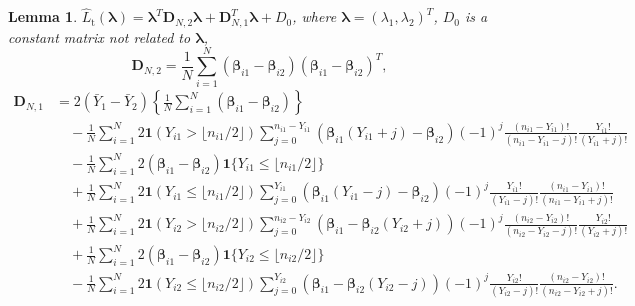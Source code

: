\documentclass[12pt,letterpaper]{article}
\newtheorem{lemma}{Lemma}[section]
\begin{document}
\begin{lemma}\label{lemma:coeff:two-sample:SURE}
$\hat{L}_{\mathrm{t}}(\boldsymbol{\lambda})=\boldsymbol{\lambda}^T\mathbf{D}_{N,2}\boldsymbol{\lambda}+\mathbf{D}_{N,1}^T\boldsymbol{\lambda}+D_0$, where $\boldsymbol{\lambda}=(\lambda_1,\lambda_2)^T$, $D_0$ is a constant matrix not related to $\boldsymbol{\lambda}$, 
\begin{equation}\label{eq:coefficient:quadratic:ML:two-sample}
    \mathbf{D}_{N,2}=\frac{1}{N}\sum_{i=1}^N(\boldsymbol{\beta}_{i1}-\boldsymbol{\beta}_{i2})(\boldsymbol{\beta}_{i1}-\boldsymbol{\beta}_{i2})^T,
\end{equation}
\begin{equation}\label{eq:D:N:1}
\begin{array}{rl}
\mathbf{D}_{N,1}\!\!\!\!\!&\displaystyle=2(\bar{Y}_1-\bar{Y}_2)\left\{\frac{1}{N}\sum_{i=1}^N(\boldsymbol{\beta}_{i1}-\boldsymbol{\beta}_{i2})\right\}\\
    &\displaystyle\quad-\frac{1}{N}\sum_{i=1}^N2\mathbf{1}(Y_{i1} > \lfloor n_{i1}/2\rfloor)\!\!\!\sum_{j=0}^{n_{i1}-Y_{i1}}\!\!\!(\boldsymbol{\beta}_{i1}(Y_{i1}+j)-\boldsymbol{\beta}_{i2})(-1)^{j}\frac{(n_{i1}-Y_{i1})!}{(n_{i1}-Y_{i1}-j)!}\frac{Y_{i1}!}{(Y_{i1}+j)!}\\
    &\quad\displaystyle-\frac{1}{N}\sum_{i=1}^N2(\boldsymbol{\beta}_{i1}-\boldsymbol{\beta}_{i2})\mathbf{1}\{Y_{i1}\leq \lfloor n_{i1}/2\rfloor\}\\
    &\quad\displaystyle+\frac{1}{N}\sum_{i=1}^N2\mathbf{1}(Y_{i1}\leq \lfloor n_{i1}/2\rfloor)\sum_{j=0}^{Y_{i1}}(\boldsymbol{\beta}_{i1}(Y_{i1}-j)-\boldsymbol{\beta}_{i2})(-1)^{j}\frac{Y_{i1}!}{(Y_{i1}-j)!}\frac{(n_{i1} - Y_{i1})!}{(n_{i1}-Y_{i1}+j)!}\\
    &\displaystyle\quad+\frac{1}{N}\sum_{i=1}^N2\mathbf{1}(Y_{i2} > \lfloor n_{i2}/2\rfloor)\!\!\!\sum_{j=0}^{n_{i2}-Y_{i2}}\!\!\!(\boldsymbol{\beta}_{i1}-\boldsymbol{\beta}_{i2}(Y_{i2}+j))(-1)^{j}\frac{(n_{i2}-Y_{i2})!}{(n_{i2}-Y_{i2}-j)!}\frac{Y_{i2}!}{(Y_{i2}+j)!}\\
    &\quad\displaystyle+\frac{1}{N}\sum_{i=1}^N2(\boldsymbol{\beta}_{i1}-\boldsymbol{\beta}_{i2})\mathbf{1}\{Y_{i2}\leq \lfloor n_{i2}/2\rfloor\}\\
    &\quad\displaystyle-\frac{1}{N}\sum_{i=1}^N2\mathbf{1}(Y_{i2}\leq \lfloor n_{i2}/2\rfloor)\sum_{j=0}^{Y_{i2}}(\boldsymbol{\beta}_{i1}-\boldsymbol{\beta}_{i2}(Y_{i2}-j))(-1)^{j}\frac{Y_{i2}!}{(Y_{i2}-j)!}\frac{(n_{i2} - Y_{i2})!}{(n_{i2}-Y_{i2}+j)!}.
\end{array}
\end{equation}
\end{lemma}
\end{document}
